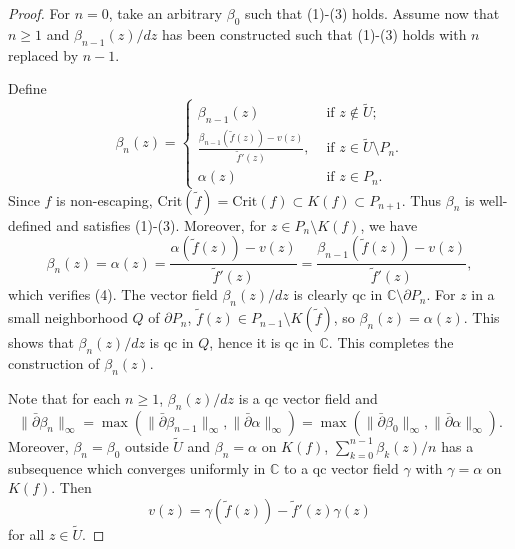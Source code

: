\documentclass{amsart}
\numberwithin{equation}{section}
\newcommand{\C}{\mathbb C}
\theoremstyle{definition}
\theoremstyle{remark}
\begin{document}
\begin{proof}
For $n=0$, take an arbitrary $\beta_0$ such that (1)-(3) holds. Assume now that $n\ge 1$ and $\beta_{n-1}(z)/dz$ has been constructed such that (1)-(3) holds with $n$ replaced by $n-1$. 

Define
$$\beta_{n}(z)=\left\{
\begin{array}{ll}
\beta_{n-1}(z) & \mbox{ if } z\not\in \widetilde{U};\\
\frac{\beta_{n-1}(\widetilde{f}(z))-v(z)}{\widetilde{f}'(z)},  
&\mbox{ if }z\in \widetilde{U}\setminus P_{n}.\\
\alpha(z) & \mbox{ if } z\in P_{n}.
\end{array}
\right.
$$
Since $f$ is non-escaping, $\text{Crit}(\widetilde{f})=\text{Crit}(f) \subset K(f)\subset P_{n+1}$. Thus $\beta_{n}$ is well-defined and satisfies (1)-(3). Moreover, for $z\in P_{n}\setminus K(f)$, we have 
$$\beta_{n}(z)=\alpha(z)=\frac{\alpha(\widetilde{f}(z))-v(z)}{\widetilde{f}'(z)}
=\frac{\beta_{n-1}(\widetilde{f}(z))-v(z)}{\widetilde{f}'(z)},$$
which verifies (4). The vector field $\beta_n(z)/dz$ is clearly qc in $\C\setminus \partial P_n$. For $z$ in a small neighborhood $Q$ of $\partial P_n$, $\widetilde{f}(z)\in P_{n-1}\setminus K(\widetilde{f})$, so $\beta_n(z)=\alpha(z)$. This shows that $\beta_n(z)/dz$ is qc in $Q$, hence it is qc in $\C$.
This completes the construction of $\beta_n(z)$. 

Note that for each $n\ge 1$, $\beta_{n}(z)/dz$ is a qc vector field and $$\|\bar{\partial} \beta_{n}\|_\infty= \max(\|\bar{\partial} \beta_{n-1}\|_\infty, \|\bar{\partial} \alpha\|_\infty)=\max(\|\bar{\partial} \beta_0\|_\infty, \|\bar{\partial} \alpha\|_\infty).$$
Moreover, $\beta_n=\beta_0$ outside $\widetilde{U}$ and $\beta_n=\alpha$ on $K(f)$,  $\sum_{k=0}^{n-1}\beta_k(z)/n$ has a subsequence which converges uniformly in $\mathbb{C}$ to a qc vector field $\gamma$ with $\gamma=\alpha$ on $K(f)$. Then 
$$v(z)=\gamma(\widetilde{f}(z))-\widetilde{f}'(z) \gamma(z)$$
for all $z\in \widetilde{U}$. 


\end{proof}
\end{document}
